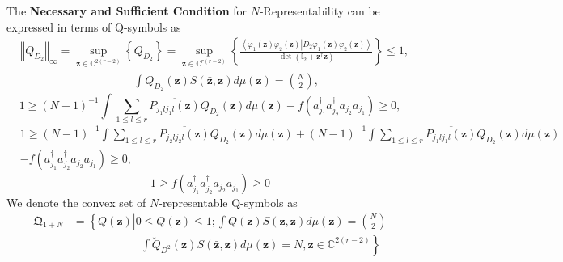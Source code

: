 \documentclass[aps,preprint]{revtex4}%
\begin{document}
The \textbf{Necessary and Sufficient Condition }for $N$-Representability can
be expressed in terms of Q-symbols as
\begin{align}
&  \left\Vert Q_{D_{2}}\right\Vert _{\infty}=\sup_{\mathbf{z\in}%
\mathbb{C}^{2\left(  r-2\right)  }}\left\{  Q_{D_{2}}\right\}  =\sup
_{\mathbf{z\in}\mathbb{C}^{r\left(  r-2\right)  }}\left\{  \frac{\left\langle
\varphi_{1}\left(  \mathbf{z}\right)  \varphi_{2}\left(  \mathbf{z}\right)
\left\vert D_{2}\varphi_{1}\left(  \mathbf{z}\right)  \varphi_{2}\left(
\mathbf{z}\right)  \right.  \right\rangle }{\det\left(  \mathbb{I}%
_{2}+\mathbf{z}^{\dagger}\mathbf{z}\right)  }\right\}  \leq1,\nonumber\\
&  \qquad\qquad\qquad\qquad\qquad\int Q_{D_{2}}\left(  \mathbf{z}\right)
S\left(  \mathbf{\bar{z},z}\right)  d\mu\left(  \mathbf{z}\right)  =\binom
{N}{2},\nonumber
\end{align}%
\begin{equation}
1\geq\left(  N-1\right)  ^{-1}\int\sum_{1\leq l\leq r}\overline{P_{j_{1}%
lj_{1}l}\left(  \mathbf{z}\right)  }Q_{D_{2}}\left(  \mathbf{z}\right)
d\mu\left(  \mathbf{z}\right)  -f\left(  a_{j_{1}}^{\dagger}a_{j_{2}}%
^{\dagger}a_{j_{2}}a_{j_{1}}\right)  \geq0,
\end{equation}%
\begin{align}
&  1\geq\left(  N-1\right)  ^{-1}\int\sum_{1\leq l\leq r}\overline
{P_{j_{2}lj_{2}l}\left(  \mathbf{z}\right)  }Q_{D_{2}}\left(  \mathbf{z}%
\right)  d\mu\left(  \mathbf{z}\right)  +\left(  N-1\right)  ^{-1}\int%
\sum_{1\leq l\leq r}\overline{P_{j_{1}lj_{1}l}\left(  \mathbf{z}\right)
}Q_{D_{2}}\left(  \mathbf{z}\right)  d\mu\left(  \mathbf{z}\right) \\
&  \left.  -\right.  f\left(  a_{j_{1}}^{\dagger}a_{j_{2}}^{\dagger}a_{j_{2}%
}a_{j_{1}}\right)  \geq0,
\end{align}%
\begin{equation}
1\geq f\left(  a_{j_{1}}^{\dagger}a_{j_{2}}^{\dagger}a_{j_{2}}a_{j_{1}%
}\right)  \geq0
\end{equation}
We denote the convex set of $N$-representable Q-symbols as
\begin{align}
\mathfrak{Q}_{1+N}  &  =\left\{  Q\left(  \mathbf{z}\right)  \left\vert 0\leq
Q\left(  \mathbf{z}\right)  \leq1;\int Q\left(  \mathbf{z}\right)  S\left(
\mathbf{\bar{z},z}\right)  d\mu\left(  \mathbf{z}\right)  =\binom{N}%
{2}\right.  \right. \nonumber\\
&  \qquad\qquad\qquad\left.  \int\breve{Q}_{D^{2}}\left(  \mathbf{z}\right)
S\left(  \mathbf{\bar{z},z}\right)  d\mu\left(  \mathbf{z}\right)
=N,\mathbf{z\in}\mathbb{C}^{2\left(  r-2\right)  }\right\}
\end{align}
\end{document}
